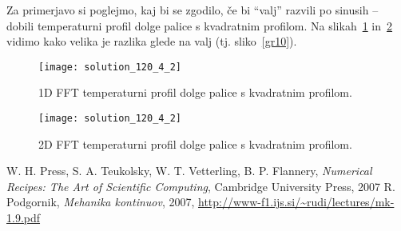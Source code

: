 \documentclass[a4 paper, 12pt]{article}
\begin{document}
Za primerjavo si poglejmo, kaj bi se zgodilo, \v ce bi "`valj"' razvili po sinusih -- dobili temperaturni
profil dolge palice s kvadratnim profilom. Na slikah~\ref{gr11} in~\ref{gr12} vidimo kako velika je
razlika glede na valj (tj. sliko~\ref{gr10}).

\begin{figure}[H]\centering
    \texttt{[image: solution\_120\_4\_2]}
    \vspace{-32pt}
    \caption{1D FFT temperaturni profil dolge palice s kvadratnim profilom.}
    \vspace{-18pt}
    \label{gr11}
\end{figure}

\begin{figure}[H]\centering
    \texttt{[image: solution\_120\_4\_2]}
    \vspace{-32pt}
    \caption{2D FFT temperaturni profil dolge palice s kvadratnim profilom.}
    \vspace{-18pt}
    \label{gr12}
\end{figure}

\begin{thebibliography}{9}
        W. H. Press, S. A. Teukolsky, W. T. Vetterling, B. P. Flannery,
        {\em Numerical Recipes: The Art of Scientific Computing},
        Cambridge University Press,
        2007
        R. Podgornik,
        {\em Mehanika kontinuov},
        2007,
        \url{http://www-f1.ijs.si/~rudi/lectures/mk-1.9.pdf}
\end{thebibliography}
\end{document}
